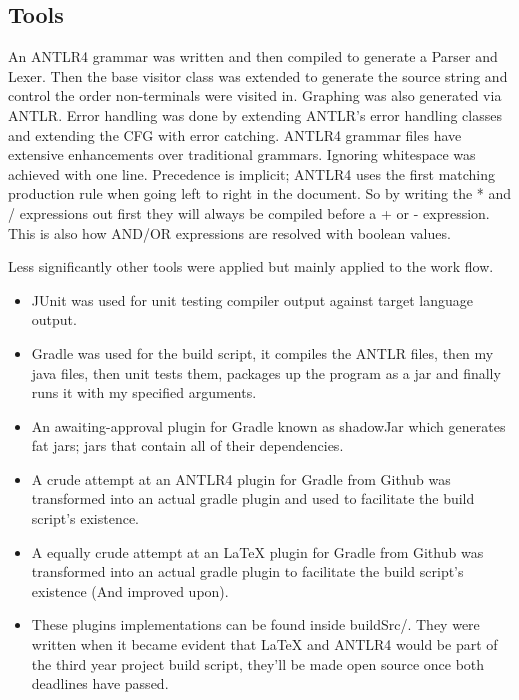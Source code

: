 \documentclass[a4paper,12pt]{article}
\begin{document}
\subsection{Tools}
An ANTLR4 grammar was written and then compiled to generate a Parser and Lexer. Then the base visitor class was extended to generate the source string and control the order non-terminals were visited in. Graphing was also generated via ANTLR. Error handling was done by extending ANTLR's error handling classes and extending the \gls{CFG} with error catching. ANTLR4 grammar files have extensive enhancements over traditional grammars. Ignoring whitespace was achieved with one
line. Precedence is implicit; ANTLR4 uses the first matching production rule when going left to right in the document. So by writing the * and / expressions out first they will always be compiled before a + or - expression. This is also how AND/OR expressions are resolved with boolean values.

Less significantly other tools were applied but mainly applied to the work flow.
\begin{itemize}
    \item JUnit was used for unit testing compiler output against target language output.
    \item Gradle was used for the build script, it compiles the ANTLR files, then my java files, then unit tests them, packages up the program as a jar and finally runs it with my specified arguments.
    \item An awaiting-approval plugin for Gradle known as shadowJar which generates fat jars; jars that contain all of their dependencies.
    \item A crude attempt at an ANTLR4 plugin for Gradle from Github was transformed into an actual gradle plugin and used to facilitate the build script's existence.
    \item A equally crude attempt at an LaTeX plugin for Gradle from Github was transformed into an actual gradle plugin to facilitate the build script's existence (And improved upon).
    \item These plugins implementations can be found inside buildSrc/. They were written when it became evident that LaTeX and ANTLR4 would be part of the third year project build script, they'll be made open source once both deadlines have passed.
\end{itemize}
\end{document}
